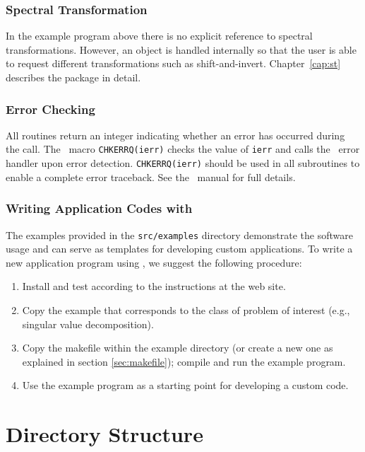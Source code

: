 \subsubsection*{Spectral Transformation}

In the example program above there is no explicit reference to spectral transformations. However, an  object is handled internally so that the user is able to request different transformations such as shift-and-invert.
Chapter~\ref{cap:st} describes the  package in detail.

\subsubsection*{Error Checking}

All \slepc routines return an integer indicating whether an error
has occurred during the call.  The \petsc\ macro \Verb!CHKERRQ(ierr)!
checks the value of \Verb!ierr! and calls the \petsc\ error handler
upon error detection.  \Verb!CHKERRQ(ierr)! should be used in all
subroutines to enable a complete error traceback. See the \petsc\ manual 
for full details.

\subsubsection*{Writing Application Codes with \slepc}

The examples provided in the \Verb!src/examples! directory demonstrate the software usage
and can serve as templates for developing
custom applications.
To write a new application program using \slepc, we suggest the
following procedure:
\begin{enumerate}
\item Install and test \slepc according to the instructions at the \slepc web site.
\item Copy the \slepc example 
      that corresponds to the class of problem of interest (e.g.,
      singular value decomposition).
\item Copy the makefile within the example directory
      (or create a new one as explained in section \ref{sec:makefile});
      compile and run the example program.
\item Use the example program as a starting point for developing a custom code.
\end{enumerate}


\section{Directory Structure}


